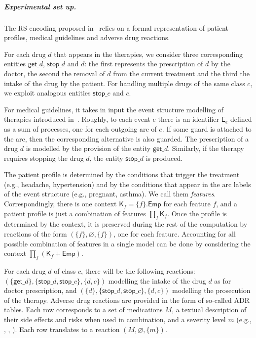 \subparagraph*{Experimental set up.}
The RS encoding proposed in~\cite{DBLP:conf/cmsb/BowlesBBFGM24} relies on a formal representation of patient profiles, medical guidelines and adverse drug reactions.

For each drug $d$ that appears in the therapies, we consider three corresponding entities $\mathsf{get}\_d$, $\mathsf{stop}\_d$  and $d$: the first represents the prescription of $d$ by the doctor, the second the removal of $d$ from the current treatment and the third the intake of the drug by the patient. For handling multiple drugs of the same class $c$, we exploit analogous entities $\mathsf{stop}\_c$  and $c$.

For medical guidelines, it takes in input the event structure modelling of therapies introduced in~\cite{BC17c}. Roughly, to each event $e$ there is an identifier $\mathsf{E}_e$ defined as a sum of processes, one for each outgoing arc of $e$. If some guard is attached to the arc, then the corresponding alternative is also guarded. The prescription of a drug $d$ is modelled by the provision of the entity $\mathsf{get}\_d$. Similarly, if the therapy requires stopping the drug $d$, the entity $\mathsf{stop}\_d$ is produced.

The patient profile is determined by the conditions that trigger the treatment (e.g., headache, hypertension) and by the conditions that appear in the arc labels of the event structure (e.g., pregnant, asthma). We call them \emph{features}. Correspondingly, there is one context $\mathsf{K}_f = \{f\}.\mathsf{Emp}$ for each feature $f$, and a patient profile is just a combination of features $\prod_f \mathsf{K}_f$. 
Once the profile is determined by the context, it is preserved during the rest of the computation by reactions of the form $(\{f\},\varnothing,\{f\})$, one for each feature.
Accounting for all possible combination of features in a single model can be done by considering the context $\prod_f (\mathsf{K}_f + \mathsf{Emp})$. 

For each drug $d$ of class $c$, there will be the following reactions: $(\{\mathsf{get}\_d\},\{\mathsf{stop}\_d,\mathsf{stop}\_c\},\{d,c\})$ modelling the intake of the drug $d$ as for doctor prescription, and $(\{d\},\{\mathsf{stop}\_d,\mathsf{stop}\_c\},\{d,c\})$ modelling the prosecution of the therapy.
Adverse drug reactions are provided in the form of so-called ADR tables.
Each row corresponds to a set of medications $M$, a textual description of their side effects and risks when used in combination, and a severity level $m$ (e.g., \minor, \moderate, \major).
Each row translates to a reaction $(M,\varnothing,\{m\})$. 

